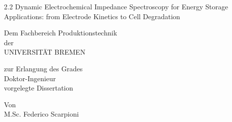 \begin{titlepage}
\thispagestyle{empty}

\vspace*{1cm}
\begin{spacing}{2.2}
{\noindent\huge
Dynamic Electrochemical Impedance Spectroscopy for Energy Storage Applications:  from Electrode Kinetics to Cell Degradation
}\par
\end{spacing}

\vspace{4cm}


{\noindent\large
Dem Fachbereich Produktionstechnik\\[0.5em]
der\\[0.5em]
UNIVERSITÄT BREMEN
\par}

\vspace{1.5cm}


{\noindent\large
zur Erlangung des Grades\\[0.5em]
Doktor-Ingenieur\\[0.5em]
vorgelegte Dissertation
\par}

\vspace{1.5cm}


{\noindent\large
Von\\[0.5em]
M.Sc. Federico Scarpioni
\par}

\vspace{\fill}







\end{titlepage}